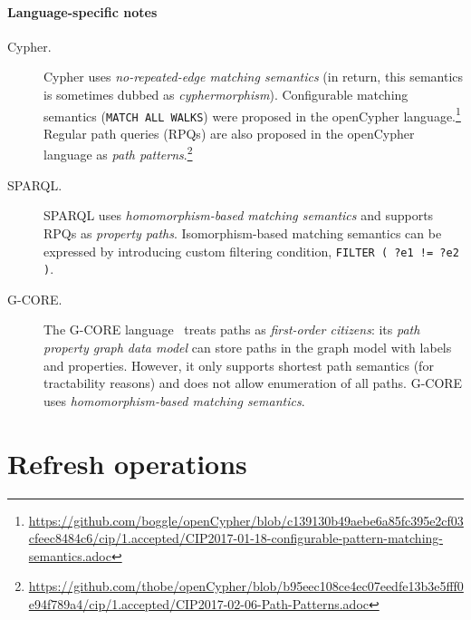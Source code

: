 \paragraph{Language-specific notes}

\begin{description}
\item[Cypher.] Cypher uses \emph{no-repeated-edge matching semantics} (in return, this semantics is sometimes dubbed as \emph{cyphermorphism}).
Configurable matching semantics (\eg \lstinline[language=cypher]{MATCH ALL WALKS}) were proposed in the openCypher language.\footnote{\url{https://github.com/boggle/openCypher/blob/c139130b49aebe6a85fc395e2cf03cfeec8484c6/cip/1.accepted/CIP2017-01-18-configurable-pattern-matching-semantics.adoc}}
Regular path queries (RPQs) are also proposed in the openCypher language as \emph{path patterns}.\footnote{\url{https://github.com/thobe/openCypher/blob/b95eec108ce4ec07eedfe13b3e5fff0e94f789a4/cip/1.accepted/CIP2017-02-06-Path-Patterns.adoc}}

\item[SPARQL.] SPARQL uses \emph{homomorphism-based matching semantics} and supports RPQs as \emph{property paths}. Isomorphism-based matching semantics can be expressed by introducing custom filtering condition, \eg \lstinline[language=sparql]{FILTER ( ?e1 != ?e2 )}.

\item[G-CORE.] The \mbox{G-CORE} language~\cite{DBLP:conf/sigmod/AnglesABBFGLPPS18} treats paths as \emph{first-order citizens}: its \emph{path property graph data model} can store paths in the graph model with labels and properties. However, it only supports shortest path semantics (for tractability reasons) and does not allow enumeration of all paths. \mbox{G-CORE} uses \emph{homomorphism-based matching semantics}.
\end{description}





\section{Refresh operations}


